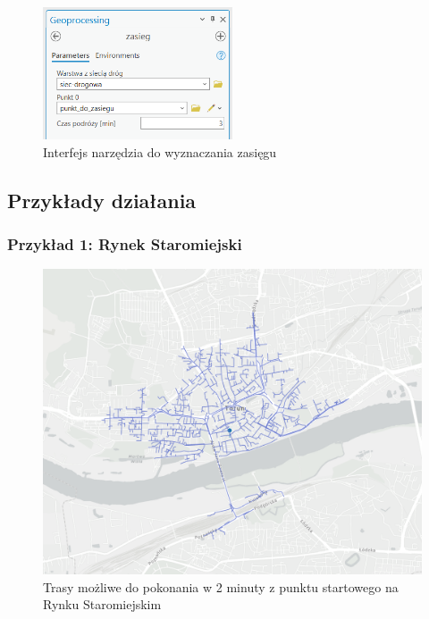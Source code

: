 \documentclass{article}
\begin{document}
\begin{figure}[H]
    \centering
    \includegraphics[width=0.5\textwidth]{img/narzedzie-interfejs-zasieg.png}
    \caption{ Interfejs narzędzia do wyznaczania zasięgu}
\end{figure}

\subsection{Przykłady działania}
\subsubsection{Przykład 1: Rynek Staromiejski}
\begin{figure}[H]
    \centering
    \includegraphics[width=1\textwidth]{img/rynek-2-min.png}
    \caption{Trasy możliwe do pokonania w 2 minuty z punktu startowego na Rynku Staromiejskim}
\end{figure}
\end{document}
